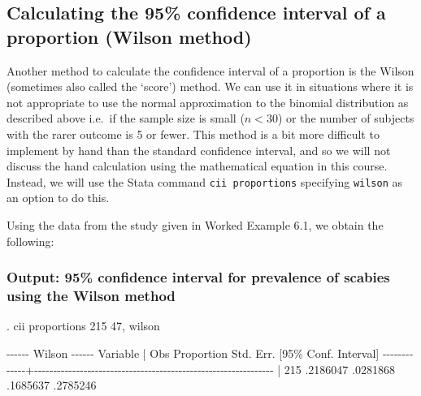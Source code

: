 \documentclass[
]{memoir}
\newenvironment{Shaded}{\begin{snugshade}}{\end{snugshade}}
\newcommand{\NormalTok}[1]{#1}
\begin{document}
\hypertarget{calculating-the-95-confidence-interval-of-a-proportion-wilson-method}{%
\subsection{Calculating the 95\% confidence interval of a proportion (Wilson method)}\label{calculating-the-95-confidence-interval-of-a-proportion-wilson-method}}

Another method to calculate the confidence interval of a proportion is the Wilson (sometimes also called the `score') method. We can use it in situations where it is not appropriate to use the normal approximation to the binomial distribution as described above i.e.~if the sample size is small (\(n < 30\)) or the number of subjects with the rarer outcome is 5 or fewer. This method is a bit more difficult to implement by hand than the standard confidence interval, and so we will not discuss the hand calculation using the mathematical equation in this course. Instead, we will use the Stata command \texttt{cii\ proportions} specifying \texttt{wilson} as an option to do this.

Using the data from the study given in Worked Example 6.1, we obtain the following:

\hypertarget{output-95-confidence-interval-for-prevalence-of-scabies-using-the-wilson-method}{%
\subsubsection*{Output: 95\% confidence interval for prevalence of scabies using the Wilson method}\label{output-95-confidence-interval-for-prevalence-of-scabies-using-the-wilson-method}}

\begin{Shaded}
\begin{Highlighting}[]
\NormalTok{. cii proportions 215 47, wilson}

\NormalTok{                                                         {-}{-}{-}{-}{-}{-} Wilson {-}{-}{-}{-}{-}{-}}
\NormalTok{    Variable |        Obs  Proportion    Std. Err.       [95\% Conf. Interval]}
\NormalTok{{-}{-}{-}{-}{-}{-}{-}{-}{-}{-}{-}{-}{-}+{-}{-}{-}{-}{-}{-}{-}{-}{-}{-}{-}{-}{-}{-}{-}{-}{-}{-}{-}{-}{-}{-}{-}{-}{-}{-}{-}{-}{-}{-}{-}{-}{-}{-}{-}{-}{-}{-}{-}{-}{-}{-}{-}{-}{-}{-}{-}{-}{-}{-}{-}{-}{-}{-}{-}{-}{-}{-}{-}{-}{-}{-}{-}}
\NormalTok{             |        215    .2186047    .0281868        .1685637    .2785246}
\end{Highlighting}
\end{Shaded}
\end{document}

